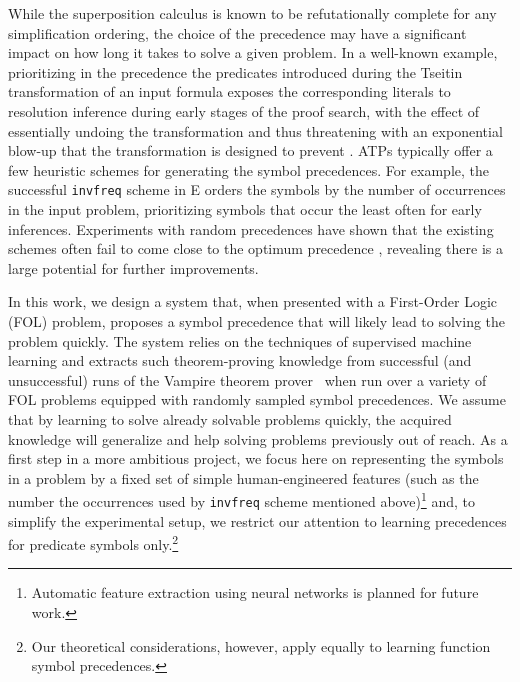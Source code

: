 While the superposition calculus is known \cite{DBLP:journals/logcom/BachmairG94} to be refutationally complete for any simplification ordering, the choice of the precedence may have a significant impact on how long it takes to solve a given problem.
In a well-known example, prioritizing in the precedence the predicates introduced during the Tseitin transformation of an input formula \cite{Tseitin1983} exposes the corresponding literals to resolution inference during early stages of the proof search,
with the effect of essentially undoing the transformation and thus threatening with an exponential blow-up
that the transformation is designed to prevent \cite{Reger2016}.
%
ATPs typically offer a few heuristic schemes for generating the symbol precedences.
For example, the successful \texttt{invfreq} scheme in E \cite{E-manual} orders the symbols by the number of occurrences in the input problem,
prioritizing symbols that occur the least often for early inferences.
Experiments with random precedences have shown that the existing schemes often fail to come close to the optimum precedence \cite{RegerSuda2017}, revealing there is a large potential for further improvements.

In this work, we design a system that, when presented with a First-Order Logic (FOL) problem,
proposes a symbol precedence that will likely lead to solving the problem quickly.
The system relies on the techniques of supervised machine learning and extracts
such theorem-proving knowledge from successful (and unsuccessful) runs of 
the Vampire theorem prover~\cite{Kovacs2013} when run over a variety of FOL problems equipped
with randomly sampled symbol precedences. 
We assume that by learning to solve already solvable problems quickly,
the acquired knowledge will generalize and help solving problems previously out of reach.
As a first step in a more ambitious project,
we focus here on representing the symbols in a problem by a fixed set of simple human-engineered features
(such as the number the occurrences used by \texttt{invfreq} scheme mentioned above)\footnote{Automatic
feature extraction using neural networks is planned for future work.}
and, to simplify the experimental setup, we restrict our attention to learning precedences for predicate symbols only.\footnote{Our theoretical considerations, however, apply equally to learning function symbol precedences.}

